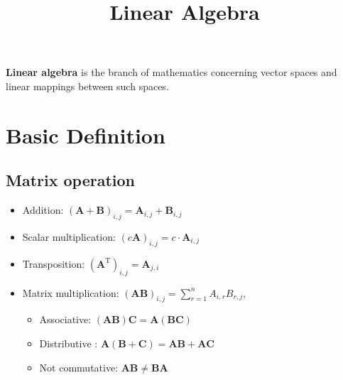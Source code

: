 \documentclass[twocolumn]{article}
\title{Linear Algebra}
\date{\vspace{-6ex}}
\numberwithin{equation}{section}
\begin{document}
\maketitle

\textbf{Linear algebra} is the branch of mathematics concerning vector spaces and linear mappings between such spaces.


\section{Basic Definition}

	\subsection{Matrix operation}
\begin{itemize}
	\item Addition: $(\mathbf{A} + \mathbf{B})_{i,j} = \mathbf{A}_{i,j} + \mathbf{B}_{i,j}$
	\item Scalar multiplication: $(c\mathbf{A})_{i,j} = c \cdot \mathbf{A}_{i,j}$
	\item Transposition: $(\mathbf{A}^\mathrm{T})_{i,j} = \mathbf{A}_{j,i}$
	\item Matrix multiplication: $ (\mathbf{AB})_{i,j} =\sum_{r=1}^n A_{i,r}B_{r,j},$
	\begin{itemize}
		\item Associative: 	$ \mathbf{(AB)C = A(BC)}$
		\item Distributive : $\mathbf{A}(\mathbf{B} + \mathbf{C}) = \mathbf{AB} + \mathbf{AC}$
		\item Not commutative: $\mathbf{A}\mathbf{B} \neq \mathbf{B}\mathbf{A}$
	\end{itemize}
\end{itemize}
\end{document}
